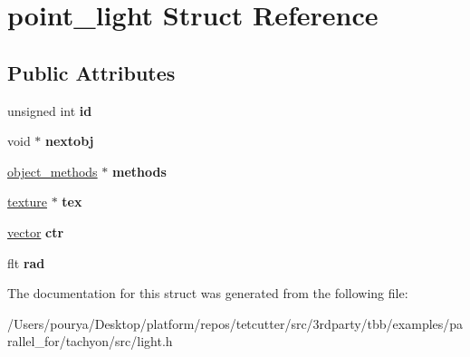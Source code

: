 \hypertarget{structpoint__light}{}\section{point\+\_\+light Struct Reference}
\label{structpoint__light}
\subsection*{Public Attributes}
\begin{DoxyCompactItemize}
\item 
\hypertarget{structpoint__light_a87ec77dd5f223a38ef08146b75b12afd}{}unsigned int {\bfseries id}\label{structpoint__light_a87ec77dd5f223a38ef08146b75b12afd}

\item 
\hypertarget{structpoint__light_a6475612793b19dff874203a64c25bd06}{}void $\ast$ {\bfseries nextobj}\label{structpoint__light_a6475612793b19dff874203a64c25bd06}

\item 
\hypertarget{structpoint__light_a2971a5bd5d3aa15500ac06ce4893b8b1}{}\hyperlink{structobject__methods}{object\+\_\+methods} $\ast$ {\bfseries methods}\label{structpoint__light_a2971a5bd5d3aa15500ac06ce4893b8b1}

\item 
\hypertarget{structpoint__light_ae37c5553f4c352aea8661f9411d0ad31}{}\hyperlink{structtexture}{texture} $\ast$ {\bfseries tex}\label{structpoint__light_ae37c5553f4c352aea8661f9411d0ad31}

\item 
\hypertarget{structpoint__light_aa305477efe3007975d1a37d17ae816e5}{}\hyperlink{structvector}{vector} {\bfseries ctr}\label{structpoint__light_aa305477efe3007975d1a37d17ae816e5}

\item 
\hypertarget{structpoint__light_a36b96bbaa1b08975187e14baaacda238}{}flt {\bfseries rad}\label{structpoint__light_a36b96bbaa1b08975187e14baaacda238}

\end{DoxyCompactItemize}


The documentation for this struct was generated from the following file\+:\begin{DoxyCompactItemize}
\item 
/\+Users/pourya/\+Desktop/platform/repos/tetcutter/src/3rdparty/tbb/examples/parallel\+\_\+for/tachyon/src/light.\+h\end{DoxyCompactItemize}
